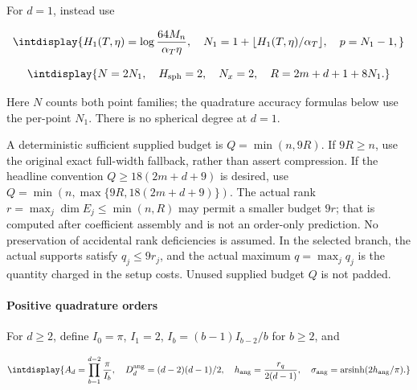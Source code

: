 
For \(d=1\), instead use


\begingroup\renewcommand{\theHequation}{intdisplay.242}
\begin{equation*}
\intdisplay{
H_1(T,\eta)=\log\frac{64M_n}{\alpha_T\eta},\quad
N_1=1+\lfloor H_1(T,\eta)/\alpha_T\rfloor,\quad p=N_1-1,
}
\end{equation*}
\endgroup

\begingroup\renewcommand{\theHequation}{intdisplay.243}
\begin{equation*}
\intdisplay{
N=2N_1,\quad H_{\rm sph}=2,\quad N_x=2,\quad
R=2m+d+1+8N_1.
}
\end{equation*}
\endgroup


Here \(N\) counts both point families; the quadrature accuracy formulas below use the per-point \(N_1\). There is no spherical degree at \(d=1\).



A deterministic sufficient supplied budget is \(Q=\min(n,\allowbreak 9R)\). If \(9R\ge n\), use the original exact full-width fallback, rather than assert compression. If the headline convention \(Q\ge18(2m+d+9)\) is desired, use \(Q=\min(n,\allowbreak \max\{9R,\allowbreak 18(2m+d+9)\})\). The actual rank \(r=\max_j\dim E_j\le\min(n,\allowbreak R)\) may permit a smaller budget \(9r\); that is computed after coefficient assembly and is not an order-only prediction. No preservation of accidental rank deficiencies is assumed. In the selected branch, the actual supports satisfy \(q_j\le9r_j\), and the actual maximum \(q=\max_jq_j\) is the quantity charged in the setup costs. Unused supplied budget \(Q\) is not padded.


\paragraph{Positive quadrature orders}
\label{int:setup-orders-detail-6}
\mbox{}\par\smallskip


For \(d\ge2\), define \(I_0=\pi\), \(I_1=2\), \(I_b=(b-1)I_{b-2}/b\) for \(b\ge2\), and


\begingroup\renewcommand{\theHequation}{intdisplay.244}
\begin{equation*}
\intdisplay{
A_d=\prod_{b=1}^{d-2}\frac{\pi}{I_b},\quad
D_d^{\rm ang}=(d-2)(d-1)/2,\quad
h_{\rm ang}=\frac{r_q}{2(d-1)},\quad
\sigma_{\rm ang}=\operatorname{arsinh}(2h_{\rm ang}/\pi).
}
\end{equation*}
\endgroup

